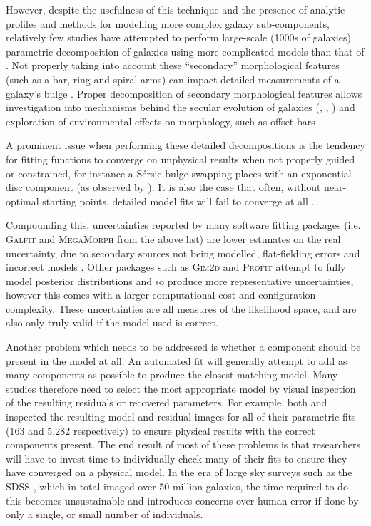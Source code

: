 \documentclass[../main.tex]{subfiles}
\begin{document}
However, despite the usefulness of this technique and the presence of analytic profiles and methods for modelling more complex galaxy sub-components, relatively few studies have attempted to perform large-scale (1000s of galaxies) parametric decomposition of galaxies using more complicated models than that of \citet{2011ApJS..196...11S}. Not properly taking into account these ``secondary'' morphological features (such as a bar, ring and spiral arms) can impact detailed measurements of a galaxy's bulge \citep{Gao2017:1709.00746v1}. Proper decomposition of secondary morphological features allows investigation into mechanisms behind the secular evolution of galaxies (\citealt{2018MNRAS.473.4731K}, \citealt{2018ApJ...862..100G}, \citealt{2015MNRAS.453.3729H}) and exploration of environmental effects on morphology, such as offset bars \citep{2017MNRAS.469.3363K}.

A prominent issue when performing these detailed decompositions is the tendency for fitting functions to converge on unphysical results when not properly guided or constrained, for instance a S\'ersic bulge swapping places with an exponential disc component (as observed by \citealt{2018MNRAS.473.4731K}). It is also the case that often, without near-optimal starting points, detailed model fits will fail to converge at all \citep{2016MNRAS.462.1470L}.

Compounding this, uncertainties reported by many software fitting packages (i.e. \textsc{Galfit} and \textsc{MegaMorph} from the above list) are lower estimates on the real uncertainty, due to secondary sources not being modelled, flat-fielding errors and incorrect models \citep{2010AJ....139.2097P}. Other packages such as \textsc{Gim2d} and \textsc{Profit} attempt to fully model posterior distributions and so produce more representative uncertainties, however this comes with a larger computational cost and configuration complexity. These uncertainties are all measures of the likelihood space, and are also only truly valid if the model used is correct.

Another problem which needs to be addressed is whether a component should be present in the model at all. An automated fit will generally attempt to add as many components as possible to produce the closest-matching model. Many studies therefore need to select the most appropriate model by visual inspection of the resulting residuals or recovered parameters. For example, both \citet{Vika2014:1408.4070v1} and \citet{2018MNRAS.473.4731K} inspected the resulting model and residual images for all of their parametric fits (163 and 5,282 respectively) to ensure physical results with the correct components present. The end result of most of these problems is that researchers will have to invest time to individually check many of their fits to ensure they have converged on a physical model. In the era of large sky surveys such as the SDSS \citep{SDSSDR7}, which in total imaged over 50 million galaxies, the time required to do this becomes unsustainable and introduces concerns over human error if done by only a single, or small number of individuals.
\end{document}
